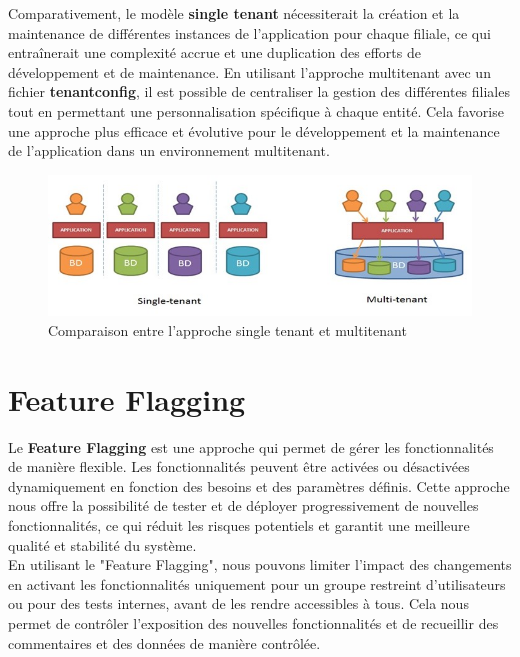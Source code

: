 Comparativement, le modèle \textbf{single tenant} nécessiterait la création et la maintenance de différentes instances de l'application pour chaque filiale, ce qui entraînerait une complexité accrue et une duplication des efforts de développement et de maintenance. En utilisant l'approche multitenant avec un fichier \textbf{tenantconfig}, il est possible de centraliser la gestion des différentes filiales tout en permettant une personnalisation spécifique à chaque entité. Cela favorise une approche plus efficace et évolutive pour le développement et la maintenance de l'application dans un environnement multitenant.
\begin{figure}[!h]
    \centering %
        \includegraphics[width=14cm]{images/conception/teant.jpg}
    \caption{Comparaison entre l’approche single tenant et multitenant}
\end{figure}

\section{Feature Flagging}
Le \textbf{Feature Flagging} est une approche qui permet de gérer les fonctionnalités de manière flexible. Les fonctionnalités peuvent être activées ou désactivées dynamiquement en fonction des besoins et des paramètres définis. Cette approche nous offre la possibilité de tester et de déployer progressivement de nouvelles fonctionnalités, ce qui réduit les risques potentiels et garantit une meilleure qualité et stabilité du système.\\

En utilisant le "Feature Flagging", nous pouvons limiter l'impact des changements en activant les fonctionnalités uniquement pour un groupe restreint d'utilisateurs ou pour des tests internes, avant de les rendre accessibles à tous. Cela nous permet de contrôler l'exposition des nouvelles fonctionnalités et de recueillir des commentaires et des données de manière contrôlée.\\

